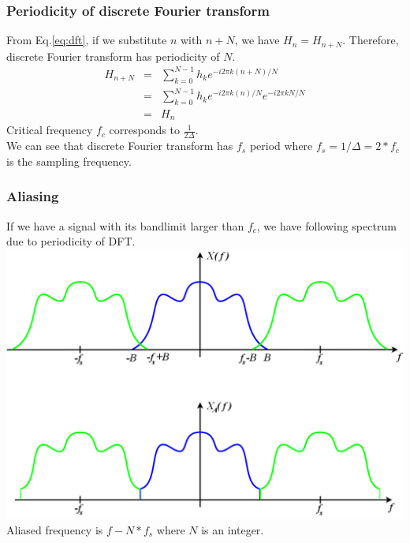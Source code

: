 \documentclass{beamer}
\begin{document}
\begin{frame}
\label{dft_periodicity}
\frametitle{Periodicity of discrete Fourier transform}
From Eq.\ref{eq:dft}, if we substitute $n$ with $n+N$, we have $H_n = H_{n+N}$. Therefore, discrete Fourier transform has periodicity of $N$.
\begin{eqnarray}
H_{n+N} &=& \sum_{k=0}^{N-1}h_ke^{-i2\pi k(n+N)/N} \nonumber \\
&=&\sum_{k=0}^{N-1}h_ke^{-i2\pi k(n)/N}e^{-i2\pi kN/N} \nonumber \\
&=&H_n
\end{eqnarray}
Critical frequency $f_c$ corresponds to $\frac{1}{2\Delta}$.\\
We can see that discrete Fourier transform has $f_s$ period where $f_s = 1/\Delta=2*f_c$ is the sampling frequency.
\end{frame}
\begin{frame}
\frametitle{Aliasing}
If we have a signal with its bandlimit larger than $f_c$, we have following spectrum due to periodicity of DFT.\\
\includegraphics[scale=0.1]{wiki_AliasedSpectrum.png}\\
Aliased frequency is $f-N*f_s$ where $N$ is an integer.
\end{frame}
\end{document}
